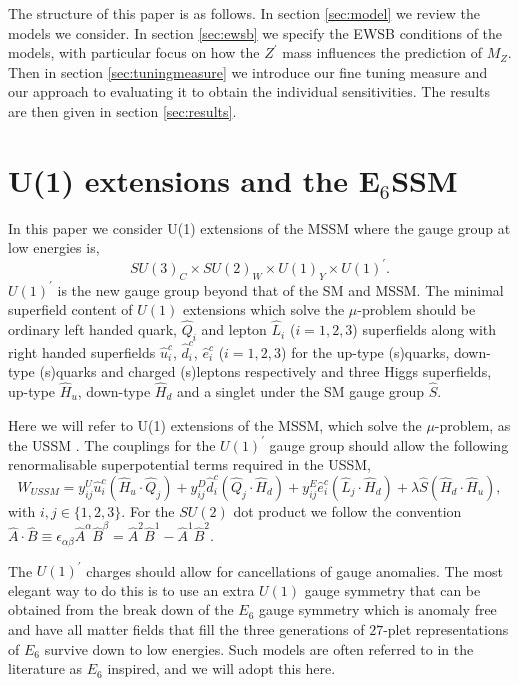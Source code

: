 \documentclass[preprint,amsmath,amssymb,aps,superscriptaddress,prd,showpacs,floatfix,nofootinbib]{revtex4-1}
\newcommand{\be}{\begin{equation}}
\newcommand{\ee}{\end{equation}}
\begin{document}
The structure of this paper is as follows.  In section \ref{sec:model}
we review the models we consider.  In section \ref{sec:ewsb} we
specify the EWSB conditions of the models, with particular focus on
how the $Z^\prime$ mass influences the prediction of $M_Z$.  Then in
section \ref{sec:tuningmeasure} we introduce our fine tuning measure
and our approach to evaluating it to obtain the individual
sensitivities.  The results are then given in section
\ref{sec:results}.

\section{\label{sec:model}U(1) extensions and the E$_6$SSM}
In this paper we consider U(1) extensions of the MSSM where the gauge
group at low energies is, \be SU(3)_C\times SU(2)_W\times U(1)_Y\times
U(1)^\prime. \ee $U(1)^\prime$ is the new gauge group beyond
that of the SM and MSSM. The minimal superfield content of $U(1)$
extensions which solve the $\mu$-problem should be ordinary left
handed quark, $\hat{Q}_i$ and lepton $\hat{L}_i$
($i=1,2,3$) superfields along with right handed superfields
$\hat{u}^c_i$, $\hat{d}^c_i$, $\hat{e}^c_i$ ($i=1,2,3$) for the
up-type (s)quarks, down-type (s)quarks and charged (s)leptons
respectively and three Higgs superfields, up-type $\hat{H}_u$,
down-type $\hat{H}_d$ and a singlet under the SM gauge group
$\hat{S}$.


Here we will refer to U(1) extensions of the MSSM, which solve the
$\mu$-problem, as the USSM \cite{Cvetic:1995rj, Jain:1995cb,
  Nir:1995bu, Cvetic:1996mf, Cvetic:1997ky}.  The couplings for the
$U(1)^\prime$ gauge group should allow the following renormalisable
superpotential terms required in the USSM, \be W_{USSM} = y^U_{ij}
\hat{u}^c_i \left ( \hat{H}_u \cdot \hat{Q}_j \right ) + y^D_{ij} \hat{d}^c_i 
\left ( \hat{Q}_j \cdot \hat{H}_d \right )
 + y^E_{ij} \hat{e}^c_i \left ( \hat{L}_j \cdot \hat{H}_d \right ) + \lambda \hat{S}
\left ( \hat{H}_d \cdot \hat{H}_u \right ), \ee with $i,j \in \{1,2,3\}$. 
For the $SU(2)$ dot product we follow the convention $\hat{A}\cdot \hat{B}\equiv \epsilon_{\alpha\beta}\hat{A}^\alpha\hat{B}^\beta=\hat{A}^2\hat{B}^1-\hat{A}^1\hat{B}^2$.


The $U(1)^\prime$ charges should allow for cancellations of gauge
anomalies.  The most elegant way to do this is to use an extra $U(1)$
gauge symmetry that can be obtained from the break down of the $E_6$
gauge symmetry which is anomaly free and have all matter fields that fill the
three generations of $27$-plet representations of $E_6$ survive down to
low energies.  Such models are often referred to in the literature as
$E_6$ inspired, and we will adopt this here.
\end{document}
